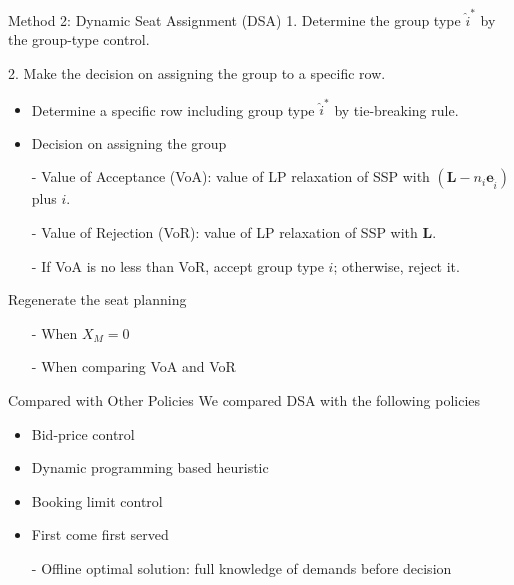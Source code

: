     \begin{frame}{Method 2: Dynamic Seat Assignment (DSA)}
      1. Determine the group type $\hat{i}^{*}$ by the group-type control.

      2. Make the decision on assigning the group to a specific row.
      \begin{itemize}
        \item Determine a specific row including group type $\hat{i}^{*}$ by tie-breaking rule. 
        \item Decision on assigning the group
        \item[-] Value of Acceptance (VoA): value of LP relaxation of SSP with $(\mathbf{L}-n_{i} \mathbf{e}_{\hat{i}})$ plus $i$.
        

        \item[-] Value of Rejection (VoR): value of LP relaxation of SSP with $\mathbf{L}$.

        \item[-] If VoA is no less than VoR, accept group type $i$; otherwise, reject it.
      \end{itemize}
      Regenerate the seat planning
      \begin{itemize}
      \item[-] When $X_{M} =0$
      \item[-] When comparing VoA and VoR 
      \end{itemize}
    \end{frame}

    \begin{frame}{Compared with Other Policies}
      We compared DSA with the following policies 
      
      \vspace{0.5cm}
      
      \begin{itemize}
        \item Bid-price control
        \item Dynamic programming based heuristic
        \item Booking limit control
        \item First come first served
        \vspace{0.1cm}
        \item[-] Offline optimal solution: full knowledge of demands before decision
      \end{itemize}
    \end{frame}


